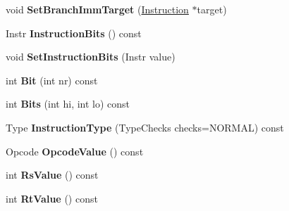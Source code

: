 \begin{DoxyCompactItemize}
\item 
void {\bfseries Set\+Branch\+Imm\+Target} (\hyperlink{classv8_1_1internal_1_1_instruction}{Instruction} $\ast$target)\hypertarget{classv8_1_1internal_1_1_instruction_ace63485d6bbbb8121c18d46aed973ef3}{}\label{classv8_1_1internal_1_1_instruction_ace63485d6bbbb8121c18d46aed973ef3}

\item 
Instr {\bfseries Instruction\+Bits} () const \hypertarget{classv8_1_1internal_1_1_instruction_afa0fa796cbf4e1d24cf72b5a910318b9}{}\label{classv8_1_1internal_1_1_instruction_afa0fa796cbf4e1d24cf72b5a910318b9}

\item 
void {\bfseries Set\+Instruction\+Bits} (Instr value)\hypertarget{classv8_1_1internal_1_1_instruction_a09df19b9577ff4a002c4f775b018d7a0}{}\label{classv8_1_1internal_1_1_instruction_a09df19b9577ff4a002c4f775b018d7a0}

\item 
int {\bfseries Bit} (int nr) const \hypertarget{classv8_1_1internal_1_1_instruction_ae6fd734924344b3ea773b8e8ffc63aa2}{}\label{classv8_1_1internal_1_1_instruction_ae6fd734924344b3ea773b8e8ffc63aa2}

\item 
int {\bfseries Bits} (int hi, int lo) const \hypertarget{classv8_1_1internal_1_1_instruction_a6924d0b3fa9f7007451ba4824ef9ce01}{}\label{classv8_1_1internal_1_1_instruction_a6924d0b3fa9f7007451ba4824ef9ce01}

\item 
Type {\bfseries Instruction\+Type} (Type\+Checks checks=N\+O\+R\+M\+AL) const \hypertarget{classv8_1_1internal_1_1_instruction_ad025c0ac68e2d0acfa1224f577d4b734}{}\label{classv8_1_1internal_1_1_instruction_ad025c0ac68e2d0acfa1224f577d4b734}

\item 
Opcode {\bfseries Opcode\+Value} () const \hypertarget{classv8_1_1internal_1_1_instruction_aac0bbcb30b456cbe3ffee0dcbe617824}{}\label{classv8_1_1internal_1_1_instruction_aac0bbcb30b456cbe3ffee0dcbe617824}

\item 
int {\bfseries Rs\+Value} () const \hypertarget{classv8_1_1internal_1_1_instruction_af70e23d79e84eab8749f9f55005f4932}{}\label{classv8_1_1internal_1_1_instruction_af70e23d79e84eab8749f9f55005f4932}

\item 
int {\bfseries Rt\+Value} () const \hypertarget{classv8_1_1internal_1_1_instruction_ac74c6589121ce12fca638685fb46befc}{}\label{classv8_1_1internal_1_1_instruction_ac74c6589121ce12fca638685fb46befc}


\end{DoxyCompactItemize}
